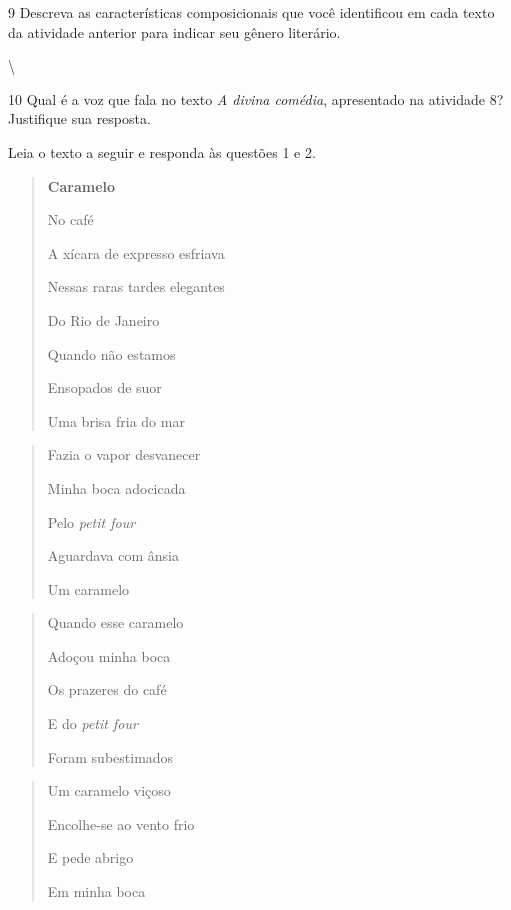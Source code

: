 \num{9} Descreva as características composicionais que você identificou
em cada texto da atividade anterior para indicar seu gênero literário.

\textbackslash {}

\num{10} Qual é a voz que fala no texto \emph{A divina comédia},
apresentado na atividade 8? Justifique sua resposta.



Leia o texto a seguir e responda às questões 1 e 2.

\begin{quote}
\textbf{Caramelo}

No café

A xícara de expresso esfriava

Nessas raras tardes elegantes

Do Rio de Janeiro

Quando não estamos

Ensopados de suor

Uma brisa fria do mar
\end{quote}

\begin{quote}
Fazia o vapor desvanecer

Minha boca adocicada

Pelo \emph{petit four}

Aguardava com ânsia

Um caramelo
\end{quote}

\begin{quote}
Quando esse caramelo

Adoçou minha boca

Os prazeres do café

E do \emph{petit four}

Foram subestimados
\end{quote}

\begin{quote}
Um caramelo viçoso

Encolhe-se ao vento frio

E pede abrigo

Em minha boca
\end{quote}

